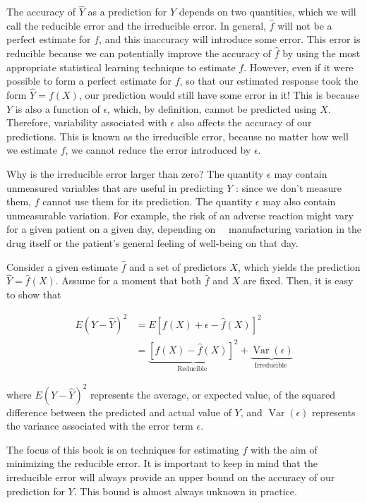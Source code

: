 \documentclass[10pt]{article}
\begin{document}
The accuracy of $\hat{Y}$ as a prediction for $Y$ depends on two quantities, which we will call the reducible error and the irreducible error. In general, $\hat{f}$ will not be a perfect estimate for $f$, and this inaccuracy will introduce some error. This error is reducible because we can potentially improve the accuracy of $\hat{f}$ by using the most appropriate statistical learning technique to estimate $f$. However, even if it were possible to form a perfect estimate for $f$, so that our estimated response took the form $\hat{Y}=f(X)$, our prediction would still have some error in it! This is because $Y$ is also a function of $\epsilon$, which, by definition, cannot be predicted using $X$. Therefore, variability associated with $\epsilon$ also affects the accuracy of our predictions. This is known as the irreducible error, because no matter how well we estimate $f$, we cannot reduce the error introduced by $\epsilon$.

Why is the irreducible error larger than zero? The quantity $\epsilon$ may contain unmeasured variables that are useful in predicting $Y$ : since we don't measure them, $f$ cannot use them for its prediction. The quantity $\epsilon$ may also contain unmeasurable variation. For example, the risk of an adverse reaction might vary for a given patient on a given day, depending on\
\
manufacturing variation in the drug itself or the patient's general feeling of well-being on that day.

Consider a given estimate $\hat{f}$ and a set of predictors $X$, which yields the prediction $\hat{Y}=\hat{f}(X)$. Assume for a moment that both $\hat{f}$ and $X$ are fixed. Then, it is easy to show that


\begin{align*}
E(Y-\hat{Y})^{2} & =E[f(X)+\epsilon-\hat{f}(X)]^{2} \\
& =\underbrace{[f(X)-\hat{f}(X)]^{2}}_{\text {Reducible }}+\underbrace{\operatorname{Var}(\epsilon)}_{\text {Irreducible }} \tag{2.3}
\end{align*}


where $E(Y-\hat{Y})^{2}$ represents the average, or expected value, of the squared difference between the predicted and actual value of $Y$, and $\operatorname{Var}(\epsilon)$ represents the variance associated with the error term $\epsilon$.

The focus of this book is on techniques for estimating $f$ with the aim of minimizing the reducible error. It is important to keep in mind that the irreducible error will always provide an upper bound on the accuracy of our prediction for $Y$. This bound is almost always unknown in practice.
\end{document}
